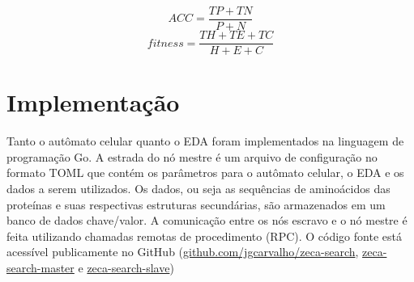 \begin{equation}
ACC = \frac{TP + TN}{P + N}
\end{equation}
\begin{equation}
fitness =  \frac{TH + TE + TC}{H + E + C}
\end{equation}

\section{Implementação}

Tanto o autômato celular quanto o EDA foram implementados na linguagem de programação Go. A estrada do nó mestre é um arquivo de configuração no formato TOML que contém os parâmetros para o autômato celular, o EDA e os dados a serem utilizados. Os dados, ou seja as sequências de aminoácidos das proteínas e suas respectivas estruturas secundárias, são armazenados em um banco de dados chave/valor. A comunicação entre os nós escravo e o nó mestre é feita utilizando chamadas remotas de procedimento (RPC). O código fonte está acessível publicamente no GitHub (\href{https://github.com/jgcarvalho/zeca-search}{github.com/jgcarvalho/zeca-search}, \href{https://github.com/jgcarvalho/zeca-search-master}{zeca-search-master} e \href{https://github.com/jgcarvalho/zeca-search-slave}{zeca-search-slave})  

